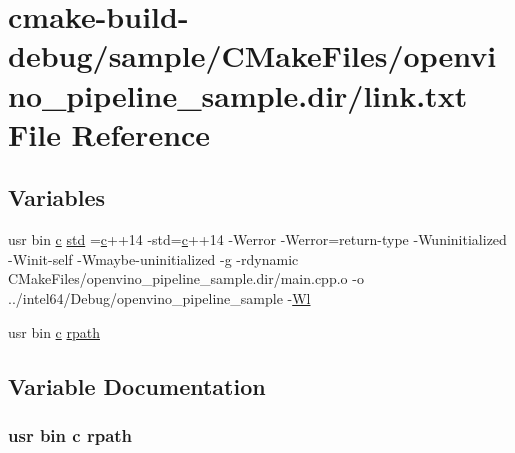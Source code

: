 \hypertarget{sample_2CMakeFiles_2openvino__pipeline__sample_8dir_2link_8txt}{}\section{cmake-\/build-\/debug/sample/\+C\+Make\+Files/openvino\+\_\+pipeline\+\_\+sample.dir/link.txt File Reference}
\label{sample_2CMakeFiles_2openvino__pipeline__sample_8dir_2link_8txt}
\subsection*{Variables}
\begin{DoxyCompactItemize}
\item 
usr bin \hyperlink{CMakeCache_8txt_aac1d6a1710812201527c735f7c6afbaa}{c} \hyperlink{sample_2CMakeFiles_2openvino__pipeline__sample_8dir_2link_8txt_a1ccfea5f558575a112db71eeb271fabf}{std} =\hyperlink{CMakeCache_8txt_aac1d6a1710812201527c735f7c6afbaa}{c}++14 -\/std=\hyperlink{CMakeCache_8txt_aac1d6a1710812201527c735f7c6afbaa}{c}++14 -\/Werror -\/Werror=return-\/type -\/Wuninitialized -\/Winit-\/self -\/Wmaybe-\/uninitialized -\/g -\/rdynamic C\+Make\+Files/openvino\+\_\+pipeline\+\_\+sample.\+dir/main.\+cpp.\+o -\/o ../intel64/Debug/openvino\+\_\+pipeline\+\_\+sample -\/\hyperlink{thirdparty_2extension_2CMakeFiles_2cpu__extension_8dir_2link_8txt_af9ccbf658ed2deb89d0d79f211e5b033}{Wl}
\item 
usr bin \hyperlink{CMakeCache_8txt_aac1d6a1710812201527c735f7c6afbaa}{c} \hyperlink{sample_2CMakeFiles_2openvino__pipeline__sample_8dir_2link_8txt_ab9d7fd7120fafa2118a4e08c1df697c7}{rpath}
\end{DoxyCompactItemize}


\subsection{Variable Documentation}
\subsubsection[{\texorpdfstring{rpath}{rpath}}]{\setlength{\rightskip}{0pt plus 5cm}usr bin {\bf c} rpath}\hypertarget{sample_2CMakeFiles_2openvino__pipeline__sample_8dir_2link_8txt_ab9d7fd7120fafa2118a4e08c1df697c7}{}\label{sample_2CMakeFiles_2openvino__pipeline__sample_8dir_2link_8txt_ab9d7fd7120fafa2118a4e08c1df697c7}


